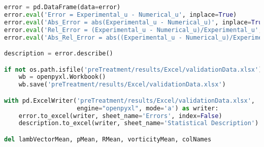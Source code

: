 \begin{lstlisting}[language=python]
error = pd.DataFrame(data=error)
error.eval('Error = Experimental_u - Numerical_u', inplace=True)
error.eval('Abs_Error = abs(Experimental_u - Numerical_u)', inplace=True)
error.eval('Rel_Error = (Experimental_u - Numerical_u)/Experimental_u', inplace=True)
error.eval('Abs_Rel_Error = abs((Experimental_u - Numerical_u)/Experimental_u)', inplace=True)

description = error.describe()

if not os.path.isfile('preTreatment/results/Excel/validationData.xlsx'):
    wb = openpyxl.Workbook()
    wb.save('preTreatment/results/Excel/validationData.xlsx')

with pd.ExcelWriter('preTreatment/results/Excel/validationData.xlsx',
                    engine="openpyxl", mode='a') as writer:
    error.to_excel(writer, sheet_name='Errors', index=False)
    description.to_excel(writer, sheet_name='Statistical Description')

del lambVectorMean, pMean, RMean, vorticityMean, colNames

\end{lstlisting}

